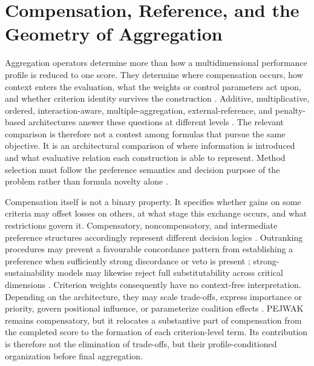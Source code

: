 \documentclass[reqno,11pt]{amsart}
\theoremstyle{definition}
\theoremstyle{plain}
\theoremstyle{remark}
\begin{document}
\section{Compensation, Reference, and the Geometry of Aggregation}
\label{sec:aggregation-positioning}

Aggregation operators determine more than how a multidimensional
performance profile is reduced to one score. They determine where
compensation occurs, how context enters the evaluation, what the weights
or control parameters act upon, and whether criterion identity survives
the construction \cite{Beliakov2007}. Additive, multiplicative, ordered,
interaction-aware, multiple-aggregation, external-reference, and
penalty-based architectures answer these questions at different levels
\cite{Bouyssou1986,Grabisch2009,Yager1988,Grabisch1996,
HwangYoon1981,Zavadskas2012,Liao2020,Wen2020,Calvo2010}. The relevant
comparison is therefore not a contest among formulas that pursue the
same objective. It is an architectural comparison of where information
is introduced and what evaluative relation each construction is able to
represent. Method selection must follow the preference semantics and
decision purpose of the problem rather than formula novelty alone
\cite{Cinelli2020,Cinelli2022,Bouyssou2000,French2002}.

Compensation itself is not a binary property. It specifies whether gains
on some criteria may offset losses on others, at what stage this exchange
occurs, and what restrictions govern it. Compensatory, noncompensatory,
and intermediate preference structures accordingly represent different
decision logics \cite{Bouyssou1986,Fishburn1976}. Outranking procedures
may prevent a favourable concordance pattern from establishing a
preference when sufficiently strong discordance or veto is present
\cite{Roy1991}; strong-sustainability models may likewise reject full
substitutability across critical dimensions \cite{Munda2008}. Criterion
weights consequently have no context-free interpretation. Depending on
the architecture, they may scale trade-offs, express importance or
priority, govern positional influence, or parameterize coalition effects
\cite{Vansnick1986}. PEJWAK remains compensatory, but it relocates a
substantive part of compensation from the completed score to the
formation of each criterion-level term. Its contribution is therefore
not the elimination of trade-offs, but their profile-conditioned
organization before final aggregation.
\end{document}
